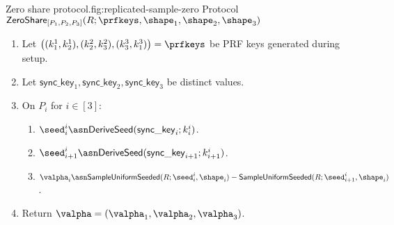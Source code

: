 \begin{Boxfig}{Zero share protocol.}{fig:replicated-sample-zero}
  {Protocol $\mathsf{ZeroShare}_{[P_1, P_2, P_3]}(R; \prfkeys, \shape_1, \shape_2, \shape_3)$}

  \begin{enumerate}
  \item Let $\left( (k_1^1, k_2^1), (k_2^2, k_3^2), (k_3^3, k_1^3) \right) = \prfkeys$ be PRF keys generated during setup.

  \item Let $\mathsf{sync\_key}_1, \mathsf{sync\_key}_2, \mathsf{sync\_key}_3$ be distinct values.

  \item On $P_i$ for $i \in [3]$:
  \begin{enumerate}
    \item ${\seed}^i_i \asn \mathsf{DeriveSeed}(\mathsf{sync\_key}_i; k^i_i)$.
    \item ${\seed}^i_{i+1} \asn \mathsf{DeriveSeed}(\mathsf{sync\_key}_{i + 1}; k^i_{i+1})$.
    \item $\valpha_i \asn \mathsf{SampleUniformSeeded}(R; \seed^i_i, \shape_i) - \mathsf{SampleUniformSeeded}(R; \seed^i_{i+1}, \shape_i)$.
  \end{enumerate}

  \item Return $\valpha = \left( \valpha_1, \valpha_2, \valpha_3 \right)$.
  \end{enumerate}
\end{Boxfig}
